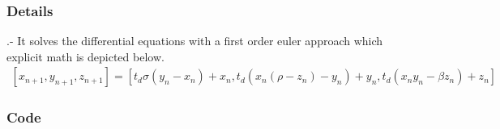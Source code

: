 \documentclass[letterpaper,10pt,english]{sphinxmanual}
\begin{document}
\subsubsection{Details}
\label{\detokenize{Functions:details}}
 .- It solves the differential equations with a first
order euler approach which explicit math is depicted below.
\begin{equation*}
\begin{split}[x_{n+1}, y_{n+1}, z_{n+1}] = [t_d \sigma  (y_n - x_n) + x_n, t_d  ( x_n  ( \rho - z_n) - y_n) + y_n, t_d (x_n y_n - \beta  z_n ) + z_n]\end{split}
\end{equation*}

\subsubsection{Code}
\label{\detokenize{Functions:code}}
\end{document}
